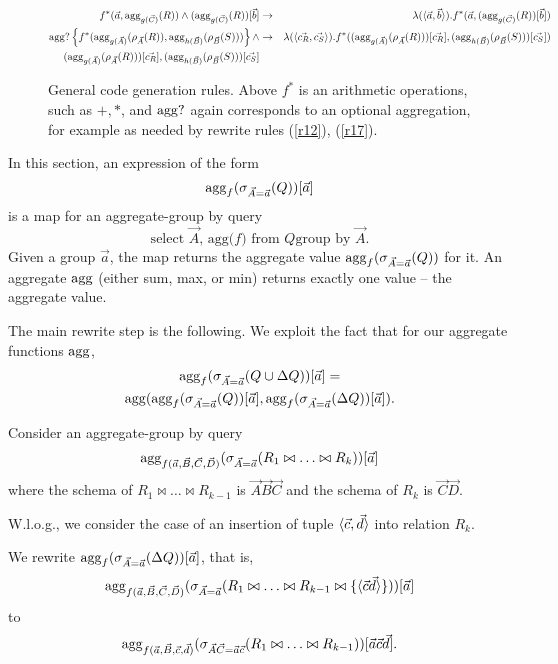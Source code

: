 \begin{figure*}
\begin{eqnarray}
f^*(\vec{a}, \mathrm{agg}_{g(\vec{C})}(R))
\wedge (\mathrm{agg}_{g(\vec{C})}(R))[\vec{b}]
& \rightarrow &
\lambda({\langle\vec{a},\vec{b}\rangle}).
f^*(\vec{a}, (\mathrm{agg}_{g(\vec{C})}(R))[\vec{b}])
\\
\mathrm{agg}?\left\{ f^*(
\mathrm{agg}_{g(\vec{A})}(\rho_{\vec{A}}(R)),
\mathrm{agg}_{h(\vec{B})}(\rho_{\vec{B}}(S)) )
\right\}
\wedge
& \rightarrow &
\lambda({\langle\vec{c_R},\vec{c_S}\rangle}).
f^*(
(\mathrm{agg}_{g(\vec{A})}(\rho_{\vec{A}}(R)))[\vec{c_R}],
(\mathrm{agg}_{h(\vec{B})}(\rho_{\vec{B}}(S)))[\vec{c_S}]
)
\\
(\mathrm{agg}_{g(\vec{A})}(\rho_{\vec{A}}(R)))[\vec{c_R}],
(\mathrm{agg}_{h(\vec{B})}(\rho_{\vec{B}}(S)))[\vec{c_S}]
& & \nonumber
\end{eqnarray}
\caption{General code generation rules. Above $f^*$ is an arithmetic
operations, such as $+,*$, and $\mathrm{agg}?$ again corresponds to an optional
aggregation, for example as needed by rewrite rules (\ref{r12}), (\ref{r17}).}
\end{figure*}

In this section, an expression of the form
\[
\mathrm{agg}_f(\sigma_{\vec{A}=\vec{a}}(Q))[\vec{a}]
\]
is a map for an aggregate-group by query
\[
\mbox{select $\vec{A}$, agg($f$)
from $Q$
group by $\vec{A}$}.
\]
Given a group $\vec{a}$, the map returns
the aggregate value
$\mathrm{agg}_f(\sigma_{\vec{A}=\vec{a}}(Q))$ for it.
An aggregate $\mathrm{agg}$ (either sum, max, or min) returns exactly
one value -- the aggregate value.

The main rewrite step is the following.
We exploit the fact that for our aggregate functions $\mathrm{agg}$,
\begin{multline*}
\mathrm{agg}_f(\sigma_{\vec{A}=\vec{a}}(Q \cup \Delta Q))[\vec{a}]
= \\
\mathrm{agg}(\mathrm{agg}_f(\sigma_{\vec{A}=\vec{a}}(Q))[\vec{a}],
\mathrm{agg}_f(\sigma_{\vec{A}=\vec{a}}(\Delta Q))[\vec{a}]).
\end{multline*}


Consider an aggregate-group by query
\[
\mathrm{agg}_{f(\vec{a}, \vec{B}, \vec{C}, \vec{D})}
(\sigma_{\vec{A}=\vec{a}}(R_1 \bowtie \dots \bowtie R_k))[\vec{a}]
\]
where the schema of $R_1 \bowtie \dots \bowtie R_{k-1}$ is
$\vec{A}\vec{B}\vec{C}$ and the schema of
$R_k$ is $\vec{C}\vec{D}$.

W.l.o.g., we consider the case of an insertion of tuple
${\langle\vec{c},\vec{d}\rangle}$ into relation $R_k$.

We rewrite
$
\mathrm{agg}_f(\sigma_{\vec{A}=\vec{a}}(\Delta Q))[\vec{a}]
$, that is,
\[
\mathrm{agg}_{f(\vec{a}, \vec{B}, \vec{C}, \vec{D})}
(\sigma_{\vec{A}=\vec{a}}(R_1 \bowtie \dots \bowtie R_{k-1} \bowtie \{{\langle\vec{c}\vec{d}\rangle}\}))[\vec{a}]
\]
to
\begin{equation}
\mathrm{agg}_{f(\vec{a}, \vec{B}, \vec{c}, \vec{d})}
(\sigma_{\vec{A}\vec{C}=\vec{a}\vec{c}}(R_1 \bowtie \dots \bowtie R_{k-1}))[\vec{a}\vec{c}\vec{d}].
\label{eq:1}
\end{equation}

